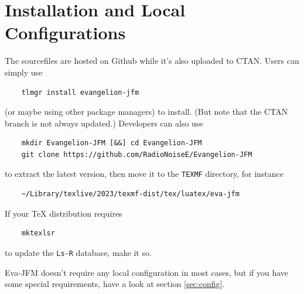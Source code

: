 \documentclass[twoside]{article}
\begin{document}
\section{Installation and Local Configurations}
The sourcefiles are hosted on Github while it's also uploaded to CTAN. Users can simply use
\begin{lstlisting}
    tlmgr install evangelion-jfm
\end{lstlisting}
(or maybe using other package managers) to install. (But note that the CTAN branch is not always updated.) Developers can also use
\begin{lstlisting}
    mkdir Evangelion-JFM [&&] cd Evangelion-JFM
    git clone https://github.com/RadioNoiseE/Evangelion-JFM
\end{lstlisting}
to extract the latest version, then move it to the \texttt{TEXMF} directory, for instance
\begin{lstlisting}
    ~/Library/texlive/2023/texmf-dist/tex/luatex/eva-jfm
\end{lstlisting}
If your {\TeX} distribution requires
\begin{lstlisting}
    mktexlsr
\end{lstlisting}
to update the \texttt{Ls-R} database, make it so.\par
\textsf{Eva-JFM} doesn't require any local configuration in most cases, but if you have some special requirements, have a look at section \ref{sec:config}.
\end{document}
